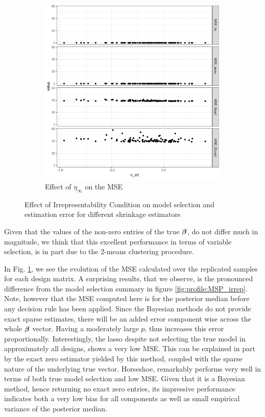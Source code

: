 \documentclass[10pt]{article}
\begin{document}
\begin{figure}[ht!]
\begin{subfigure}[t]{0.45\textwidth}
\includegraphics[width=\columnwidth]{Irrep_MSE_selec_n100p60_q50_2groups}%
\caption{Effect of  $\eta_{\infty}$ on the MSE}%
\label{fig:profile:MSE_irrep}%
\end{subfigure}
\caption{Effect of Irrepresentability Condition on model selection and estimation error for different shrinkage estimators}
\label{fig:profile}
\end{figure}

Given that the values of the non-zero entries of the true $\boldsymbol{\beta}$, do not differ much in magnitude, we think that this excellent performance in terms of variable selection, is in part due to the 2-means clustering procedure. 

In Fig. \ref{fig:profile:MSE_irrep}, we see the evolution of the MSE calculated over the replicated samples for each design matrix. A surprising results, that we observe, is the pronounced difference from the model selection summary in figure \ref{fig:profile:MSP_irrep}. Note, however that the MSE computed here is for the posterior median before any decision rule has been applied. Since the Bayesian methods do not provide exact sparse estimates, there will be an added error component wise across the whole $\boldsymbol{\beta}$ vector. Having a moderately large $p$, thus increases this error proportionally. Interestingly, the lasso despite not selecting the true model in approximately all designs, shows a very low MSE. This can be explained in part by the exact zero estimator yielded by this method, coupled with the sparse nature of the underlying true vector. Horseshoe, remarkably performs very well in terms of both true model selection and low MSE. Given that it is a Bayesian method, hence returning no exact zero entries, its impressive performance indicates both a very low bias for all components as well as small empirical variance of the posterior median.
\end{document}
